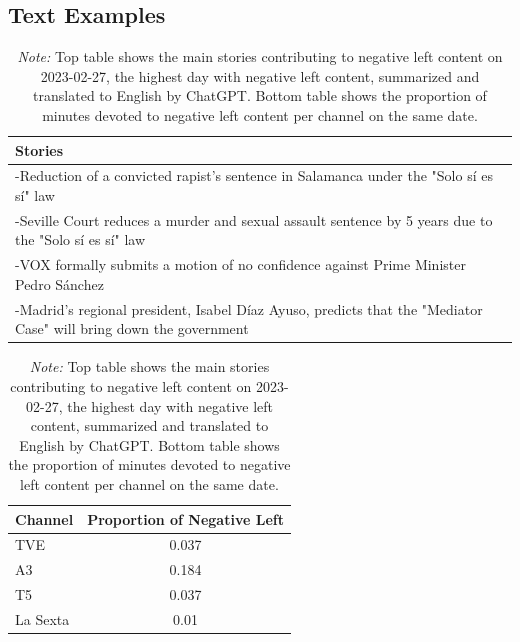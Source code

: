 \documentclass[12pt]{article}
\begin{document}
	
\clearpage
	\subsection{Text Examples}
	
	
	
		\begin{table}[!htb]
								\caption{Top Stories for Negative Left and Outlet's Production}
		\centering
		\begin{tabular}{p{}}
			\toprule
			\textbf{Stories}  \\
			\midrule
			-Reduction of a convicted rapist’s sentence in Salamanca under the "Solo sí es sí" law  \\
			-Seville Court reduces a murder and sexual assault sentence by 5 years due to the "Solo sí es sí" law  \\
			-VOX formally submits a motion of no confidence against Prime Minister Pedro Sánchez  \\
			-Madrid’s regional president, Isabel Díaz Ayuso, predicts that the "Mediator Case" will bring down the government  \\
			\bottomrule
		\end{tabular}
		\begin{tabular}{l c}
			\toprule
			\textbf{Channel} & \textbf{Proportion of Negative Left} \\
			\midrule
			TVE & 0.037 \\
			A3  & 0.184 \\
			T5  & 0.037 \\
			La Sexta  & 0.01 \\
			\bottomrule
		\end{tabular}

		
					\caption*{\small  \textit{Note:} Top table shows the main stories contributing to negative left content on 2023-02-27, the highest day with negative left content,  summarized and translated to English by ChatGPT. Bottom table shows the proportion of minutes devoted to negative left content per channel on the same date.}
		
		\label{tab:neg_left_channels}
	\end{table}
	
\end{document}
